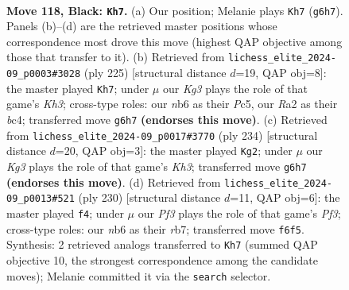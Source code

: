 \documentclass[11pt]{article}
\begin{document}
\clearpage

\begin{figure}[p]\centering
\begin{subfigure}{0.46\textwidth}\centering
\resizebox{\linewidth}{!}{%
\newchessgame
\chessboard[
  setfen={4R3/6p1/1N3pk1/7p/7P/6PK/r7/8 b - - 61 118},
  showmover=false,
  pgfstyle=straightmove, color=movearrow, markmove={g6-h7}
]}
\caption{}
\end{subfigure}\hfill
\begin{subfigure}{0.46\textwidth}\centering
\resizebox{\linewidth}{!}{%
\newchessgame
\chessboard[
  setfen={8/8/6pk/2p4p/2B2P1P/2b3PK/8/8 b - - 49 113},
  showmover=false,
  pgfstyle=straightmove, color=movearrow, markmove={h6-h7}
]}
\caption{}
\end{subfigure}
\\[4pt]
\begin{subfigure}{0.46\textwidth}\centering
\resizebox{\linewidth}{!}{%
\newchessgame
\chessboard[
  setfen={8/8/6p1/5k1p/7P/4R1PK/8/r7 w - - 72 118},
  showmover=false,
  pgfstyle=straightmove, color=movearrow, markmove={h3-g2}
]}
\caption{}
\end{subfigure}\hfill
\begin{subfigure}{0.46\textwidth}\centering
\resizebox{\linewidth}{!}{%
\newchessgame
\chessboard[
  setfen={8/1r6/6pk/7p/R6P/5PP1/5K2/8 w - - 41 116},
  showmover=false,
  pgfstyle=straightmove, color=movearrow, markmove={f3-f4}
]}
\caption{}
\end{subfigure}
\caption{\textbf{Move 118, Black: \texttt{Kh7}.} (a) Our position; Melanie plays \texttt{Kh7} (\texttt{g6h7}). Panels (b)--(d) are the retrieved master positions whose correspondence most drove this move (highest QAP objective among those that transfer to it). (b) Retrieved from \texttt{lichess\_elite\_2024-09\_p0003\#3028} (ply 225) [structural distance $d$=19, QAP obj=8]: the master played \texttt{Kh7}; under $\mu$ our \emph{Kg3} plays the role of that game's \emph{Kh3}; cross-type roles: our \emph{n}b6 as their \emph{P}c5, our \emph{R}a2 as their \emph{b}c4; transferred move \texttt{g6h7} \textbf{(endorses this move)}. (c) Retrieved from \texttt{lichess\_elite\_2024-09\_p0017\#3770} (ply 234) [structural distance $d$=20, QAP obj=3]: the master played \texttt{Kg2}; under $\mu$ our \emph{Kg3} plays the role of that game's \emph{Kh3}; transferred move \texttt{g6h7} \textbf{(endorses this move)}. (d) Retrieved from \texttt{lichess\_elite\_2024-09\_p0013\#521} (ply 230) [structural distance $d$=11, QAP obj=6]: the master played \texttt{f4}; under $\mu$ our \emph{Pf3} plays the role of that game's \emph{Pf3}; cross-type roles: our \emph{n}b6 as their \emph{r}b7; transferred move \texttt{f6f5}. Synthesis: 2 retrieved analogs transferred to \texttt{Kh7} (summed QAP objective 10, the strongest correspondence among the candidate moves); Melanie committed it via the \texttt{search} selector.}
\label{fig:thought-m235}
\end{figure}
\end{document}
